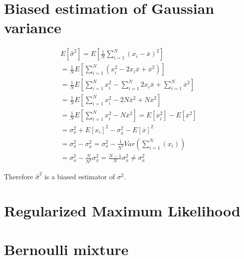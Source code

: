 \documentclass{article}
\begin{document}
\section{Biased estimation of Gaussian variance}

\begin{equation}
\begin{split}
E [ \hat { \sigma } ^ { 2 } ] = E [ \frac { 1 } { N } \sum _ { i = 1 } ^ { N } ( x _ { i } - \overline { x } ) ^ { 2 } ]  \\
= \frac { 1 } { N } E [ \sum _ { i = 1 } ^ { N } ( x _ { i } ^ { 2 } - 2 x _ { i } \overline { x } + \overline { x } ^ { 2 } ) ]  \\ 
= \frac { 1 } { N } E [ \sum _ {i = 1} ^ { N } x _ { i } ^ { 2 } - \sum _ {i = 1}^ { N } 2 x _ { i} \overline { x } + \sum_ {i = 1} ^ { N } \overline { x } ^ { 2 } ] \\
= \frac { 1 } { N } E [ \sum _ {i = 1} ^ { N } x _ { i } ^ { 2 } - 2N \overline { x }^{2} + N \overline { x } ^ { 2 } ] \\
= \frac { 1 } { N } E [ \sum _ {i = 1} ^ { N } x _ { i } ^ { 2 } - N \overline { x } ^ { 2 } ]  = E [  x _ { i } ^ { 2 } ]- E[\overline { x } ^ { 2 } ]  \\
= \sigma _ { x } ^ { 2 } + E [ x _ { i } ] ^ { 2 } - \sigma _ { \overline { x } } ^ { 2 } - E [ \overline { x }  ] ^ { 2 } \\
= \sigma _ { x } ^ { 2 } - \sigma _ { \overline x } ^ { 2 }  = \sigma _ { x } ^ { 2 } - \frac{1}{N^2}Var(\sum _ { i = 1 } ^ { N } ( x _ { i } )) \\ 
= \sigma _ { x } ^ { 2 } - \frac{N}{N^2}\sigma _ { x } ^ { 2 } =  \frac{N-1}{N}\sigma _ { x } ^ { 2 } \neq \sigma _ { x } ^ { 2 }
\end{split}
\end{equation}

Therefore  \(\hat { \sigma } ^ { 2 }\) is a biased estimator of \({ \sigma } ^ { 2 }\).


\section{Regularized Maximum Likelihood}

\section{Bernoulli mixture}
\end{document}
